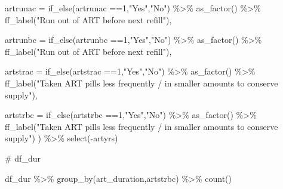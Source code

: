 \documentclass[
  letterpaper,
  DIV=11,
  numbers=noendperiod]{scrartcl}
\newenvironment{Shaded}{\begin{snugshade}}{\end{snugshade}}
\newcommand{\AttributeTok}[1]{\textcolor[rgb]{0.40,0.45,0.13}{#1}}
\newcommand{\CommentTok}[1]{\textcolor[rgb]{0.37,0.37,0.37}{#1}}
\newcommand{\DecValTok}[1]{\textcolor[rgb]{0.68,0.00,0.00}{#1}}
\newcommand{\FunctionTok}[1]{\textcolor[rgb]{0.28,0.35,0.67}{#1}}
\newcommand{\NormalTok}[1]{\textcolor[rgb]{0.00,0.23,0.31}{#1}}
\newcommand{\SpecialCharTok}[1]{\textcolor[rgb]{0.37,0.37,0.37}{#1}}
\newcommand{\StringTok}[1]{\textcolor[rgb]{0.13,0.47,0.30}{#1}}
\begin{document}
\begin{Shaded}
\begin{Highlighting}[]
     \AttributeTok{artrunac =} \FunctionTok{if\_else}\NormalTok{(artrunac }\SpecialCharTok{==}\DecValTok{1}\NormalTok{,}\StringTok{"Yes"}\NormalTok{,}\StringTok{"No"}\NormalTok{) }\SpecialCharTok{\%\textgreater{}\%} 
    \FunctionTok{as\_factor}\NormalTok{() }\SpecialCharTok{\%\textgreater{}\%} 
    \FunctionTok{ff\_label}\NormalTok{(}\StringTok{"Run out of ART before next refill"}\NormalTok{),}
 
   \AttributeTok{artrunbc =} \FunctionTok{if\_else}\NormalTok{(artrunbc }\SpecialCharTok{==}\DecValTok{1}\NormalTok{,}\StringTok{"Yes"}\NormalTok{,}\StringTok{"No"}\NormalTok{) }\SpecialCharTok{\%\textgreater{}\%} 
    \FunctionTok{as\_factor}\NormalTok{() }\SpecialCharTok{\%\textgreater{}\%} 
    \FunctionTok{ff\_label}\NormalTok{(}\StringTok{"Run out of ART before next refill"}\NormalTok{),}
  
  \AttributeTok{artstrac =} \FunctionTok{if\_else}\NormalTok{(artstrac }\SpecialCharTok{==}\DecValTok{1}\NormalTok{,}\StringTok{"Yes"}\NormalTok{,}\StringTok{"No"}\NormalTok{) }\SpecialCharTok{\%\textgreater{}\%} 
    \FunctionTok{as\_factor}\NormalTok{() }\SpecialCharTok{\%\textgreater{}\%} 
    \FunctionTok{ff\_label}\NormalTok{(}\StringTok{"Taken ART pills less frequently / in smaller}
\StringTok{amounts to conserve supply"}\NormalTok{),}
  
  \AttributeTok{artstrbc =} \FunctionTok{if\_else}\NormalTok{(artstrbc }\SpecialCharTok{==}\DecValTok{1}\NormalTok{,}\StringTok{"Yes"}\NormalTok{,}\StringTok{"No"}\NormalTok{) }\SpecialCharTok{\%\textgreater{}\%} 
    \FunctionTok{as\_factor}\NormalTok{() }\SpecialCharTok{\%\textgreater{}\%} 
    \FunctionTok{ff\_label}\NormalTok{(}\StringTok{"Taken ART pills less frequently / in smaller}
\StringTok{amounts to conserve supply"}\NormalTok{)}
\NormalTok{  ) }\SpecialCharTok{\%\textgreater{}\%} 
  \FunctionTok{select}\NormalTok{(}\SpecialCharTok{{-}}\NormalTok{artyrs)}
\end{Highlighting}
\end{Shaded}

\begin{Shaded}
\begin{Highlighting}[]
\CommentTok{\# df\_dur}
\end{Highlighting}
\end{Shaded}

\begin{Shaded}
\begin{Highlighting}[]
\NormalTok{df\_dur }\SpecialCharTok{\%\textgreater{}\%} \FunctionTok{group\_by}\NormalTok{(art\_duration,artstrbc) }\SpecialCharTok{\%\textgreater{}\%} 
  \FunctionTok{count}\NormalTok{()}
\end{Highlighting}
\end{Shaded}
\end{document}
